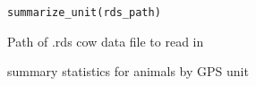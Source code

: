 \documentclass[a4paper]{book}
\begin{document}
%
\begin{Usage}
\begin{verbatim}
summarize_unit(rds_path)
\end{verbatim}
\end{Usage}
%
\begin{Arguments}
\begin{ldescription}
\item[\code{rds\_path}] Path of .rds cow data file to read in
\end{ldescription}
\end{Arguments}
%
\begin{Value}
summary statistics for animals by GPS unit
\end{Value}
\printindex{}
\end{document}
